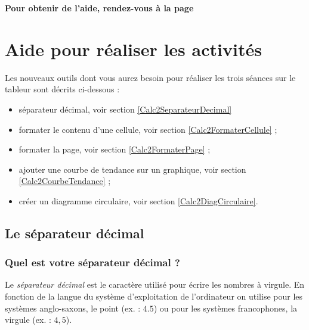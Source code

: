 \textbf{Pour obtenir de l'aide, rendez-vous à la page \pageref{Tableur5eOutils}}



\vfill
\phantom{rien}


\newpage

\section{Aide pour réaliser les activités}\label{Tableur5eOutils}
 
Les nouveaux outils dont vous aurez besoin pour réaliser les trois séances sur le tableur sont décrits ci-dessous :

\begin{itemize}  
\item séparateur décimal, voir section \vref{Calc2SeparateurDecimal}  
\item formater le contenu d'une cellule, voir section \vref{Calc2FormaterCellule} ;
\item formater la page, voir section \vref{Calc2FormaterPage} ;
\item ajouter une courbe de tendance sur un graphique, voir section \vref{Calc2CourbeTendance} ;
\item créer un diagramme circulaire, voir section \vref{Calc2DiagCirculaire}.
\end{itemize}  

\subsection{Le séparateur décimal}\label{Calc2SeparateurDecimal}



\subsubsection{Quel est votre séparateur décimal ?}


Le \emph{séparateur décimal} est le caractère utilisé pour écrire les nombres à virgule. En fonction de la langue du système d'exploitation de l'ordinateur on utilise pour les systèmes anglo-saxons, le point (ex. : $4.5$) ou pour les systèmes francophones, la virgule (ex. : $4,5$).

